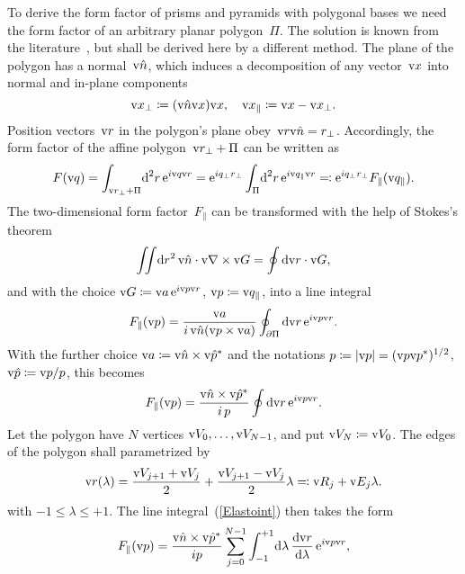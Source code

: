 To derive the form factor of prisms and pyramids with polygonal bases
we need the form factor of an arbitrary planar polygon~$\Pi$.
The solution is known from the literature~\cite{LeMi83},
but shall be derived here by a different method.
The plane of the polygon has a normal~$\text{v}{\hat n}$,
which induces a decomposition of any vector~$\text{v}{x}$ into normal
and in-plane components
\begin{equation}
  \text{v}{x}_\perp\coloneqq (\text{v}{\hat n}\text{v}{x})\text{v}{x},\quad
  \text{v}{x}_\parallel\coloneqq\text{v}{x}-\text{v}{x}_\perp.
\end{equation}
Position vectors~$\text{v}{r}$ in the polygon's plane obey~$\text{v}{r}\text{v}{\hat n}=r_\perp$.
Accordingly, the form factor of the affine polygon~$\text{v}{r}_\perp+\Pi$
can be written as
%
\begin{equation}\label{Eff2d}
  F(\text{v}{q})
  = \int_{\text{v}{r}_\perp+\Pi}\!\text{d}^2r\, \text{e}^{i\text{v}{q}\text{v}{r}}
  =\text{e}^{iq_\perp r_\perp} \int_{\Pi}\!\text{d}^2r\, \text{e}^{i\text{v}{q}_\parallel\text{v}{r}}
  \eqqcolon \text{e}^{iq_\perp r_\perp} F_\parallel(\text{v}{q}_\parallel).
\end{equation}
The two-dimensional form factor~$F_\parallel$
can be transformed with the help of Stokes's theorem
\begin{equation}
  \iint\!\text{d} r^2\,\text{v}{\hat n}\cdot\text{v}{\nabla}\times\text{v}{G} = \oint \text{d}\text{v}{r}\cdot\text{v}{G},
\end{equation}
and with the choice $\text{v}{G}\coloneqq\text{v}{a}\, \text{e}^{i\text{v}{p}\text{v}{r}}$, $\text{v}{p}\coloneqq\text{v}{q}_\parallel$,
into a line integral
\begin{equation}
  F_\parallel(\text{v}{p})=\frac{\text{v}{a}}{i\, \text{v}{\hat n}(\text{v}{p}\times\text{v}{a})} \oint_{\partial\Pi} \text{d}\text{v}{r}\,\text{e}^{i\text{v}{p}\text{v}{r}}.
\end{equation}
With the further choice $\text{v}{a}\coloneqq\text{v}{\hat n}\times\text{v}{\hat p}^*$
and the notations $p\coloneqq|\text{v}{p}|=(\text{v}{p}\text{v}{p}^*)^{1/2}$, $\text{v}{\hat p}\coloneqq\text{v}{p}/p$,
this becomes
\begin{equation}\label{Elastoint}
  F_\parallel(\text{v}{p})=\frac{\text{v}{\hat n}\times\text{v}{\hat p}^*}{i\,p} \oint \text{d}\text{v}{r}\,\text{e}^{i\text{v}{p}\text{v}{r}}.
\end{equation}
Let the polygon have $N$ vertices $\text{v}{V}_0,\ldots,\text{v}{V}_{N-1}$,
and put $\text{v}{V}_N\coloneqq\text{v}{V}_0$.
The edges of the polygon shall parametrized by
\begin{equation}
  \text{v}{r}(\lambda) = \frac{\text{v}{V}_{j+1}+\text{v}{V}_j}{2} + \frac{\text{v}{V}_{j+1}-\text{v}{V}_j}{2} \lambda
  \eqqcolon \text{v}{R}_j + \text{v}{E}_j\lambda.
\end{equation}
with $-1\le\lambda\le+1$.
The line integral~(\ref{Elastoint}) then takes the form
\begin{equation}
    F_\parallel(\text{v}{p})
   = \frac{\text{v}{\hat n}\times\text{v}{\hat p}^*}{ip} \sum_{j=0}^{N-1}
              \int_{-1}^{+1}\!\text{d}\lambda\, \frac{\text{d}\text{v}{r}}{\text{d}\lambda}\,\text{e}^{i\text{v}{p}\text{v}{r}},
\end{equation}
